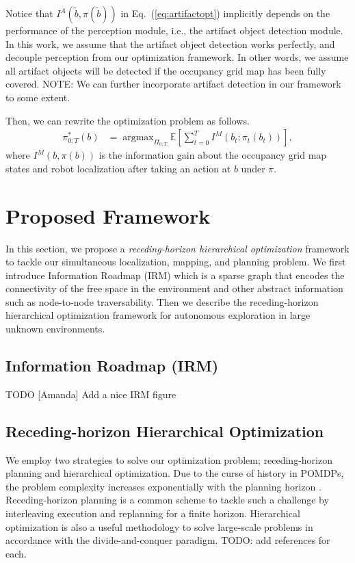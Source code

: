 \documentclass[letterpaper, 10 pt, conference]{ieeeconf}  %
\newcommand{\todo}[1]{{\color{red} #1 }} %
\newcommand{\note}[1]{{\color{cyan} NOTE: #1 }}
\newcommand{\argmax}{\mathop{\mathrm{argmax}}}
\begin{document}
Notice that $I^A(\tilde{b}, \pi(\tilde{b}))$ in Eq.~(\ref{eq:artifactopt}) implicitly depends on the performance of the perception module, i.e., the artifact object detection module.
In this work, we assume that the artifact object detection works perfectly, and decouple perception from our optimization framework.
In other words, we assume all artifact objects will be detected if the occupancy grid map has been fully covered.
\note{We can further incorporate artifact detection in our framework to some extent.}

Then, we can rewrite the optimization problem as follows.
\begin{align}
  \pi_{0:T}^*(b) & = \argmax_{\Pi_{0:T}} \mathbb{E} \left[ \sum_{t=0}^T I^M(b_t; \pi_t(b_t)) \right],
  \label{eq:occupancyopt}
\end{align}
where $I^M(b, \pi(b))$ is the information gain about the occupancy grid map states and robot localization after taking an action at $b$ under $\pi$.

\section{Proposed Framework}

In this section, we propose a \emph{receding-horizon hierarchical optimization} framework to tackle our simultaneous localization, mapping, and planning problem.
We first introduce Information Roadmap (IRM) which is a sparse graph that encodes the connectivity of the free space in the environment and other abstract information such as node-to-node traversability.
Then we describe the receding-horizon hierarchical optimization framework for autonomous exploration in large unknown environments.


\subsection{Information Roadmap (IRM)}

\todo{TODO}
\todo{[Amanda] Add a nice IRM figure}


\subsection{Receding-horizon Hierarchical Optimization}

We employ two strategies to solve our optimization problem; receding-horizon planning and hierarchical optimization.
%
Due to the curse of history in POMDPs, the problem complexity increases exponentially with the planning horizon \cite{Pineau03}.
Receding-horizon planning is a common scheme to tackle such a challenge by interleaving execution and replanning for a finite horizon.
%
Hierarchical optimization is also a useful methodology to solve large-scale problems in accordance with the divide-and-conquer paradigm.
\todo{TODO: add references for each.}
\end{document}
